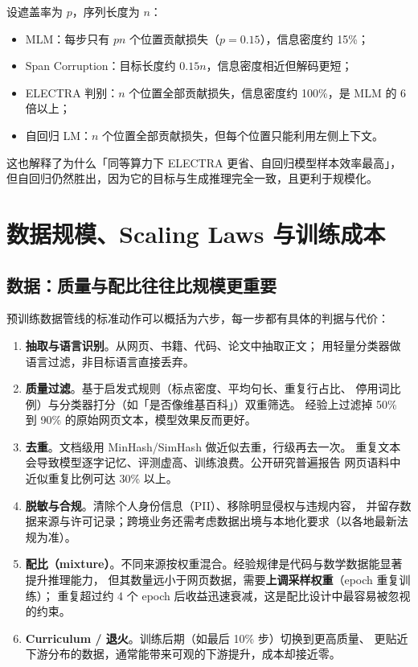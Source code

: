 \begin{formulacard}[各预训练目标的信息密度对比]
设遮盖率为 $p$，序列长度为 $n$：
\begin{itemize}
  \item MLM：每步只有 $pn$ 个位置贡献损失（$p = 0.15$），信息密度约 15\%；
  \item Span Corruption：目标长度约 $0.15n$，信息密度相近但解码更短；
  \item ELECTRA 判别：$n$ 个位置全部贡献损失，信息密度约 100\%，是 MLM 的 6 倍以上；
  \item 自回归 LM：$n$ 个位置全部贡献损失，但每个位置只能利用左侧上下文。
\end{itemize}
这也解释了为什么「同等算力下 ELECTRA 更省、自回归模型样本效率最高」，
但自回归仍然胜出，因为它的目标与生成推理完全一致，且更利于规模化。
\end{formulacard}

\section{数据规模、Scaling Laws 与训练成本}
\label{sec:nlp-scaling}

\subsection{数据：质量与配比往往比规模更重要}

预训练数据管线的标准动作可以概括为六步，每一步都有具体的判据与代价：

\begin{enumerate}
  \item \textbf{抽取与语言识别}。从网页、书籍、代码、论文中抽取正文；
        用轻量分类器做语言过滤，非目标语言直接丢弃。
  \item \textbf{质量过滤}。基于启发式规则（标点密度、平均句长、重复行占比、
        停用词比例）与分类器打分（如「是否像维基百科」）双重筛选。
        经验上过滤掉 50\% 到 90\% 的原始网页文本，模型效果反而更好。
  \item \textbf{去重}。文档级用 MinHash/SimHash 做近似去重，行级再去一次。
        重复文本会导致模型逐字记忆、评测虚高、训练浪费。公开研究普遍报告
        网页语料中近似重复比例可达 30\% 以上。
  \item \textbf{脱敏与合规}。清除个人身份信息（PII）、移除明显侵权与违规内容，
        并留存数据来源与许可记录；跨境业务还需考虑数据出境与本地化要求（以各地最新法规为准）。
  \item \textbf{配比（mixture）}。不同来源按权重混合。经验规律是代码与数学数据能显著提升推理能力，
        但其数量远小于网页数据，需要\textbf{上调采样权重}（epoch 重复训练）；
        重复超过约 4 个 epoch 后收益迅速衰减，这是配比设计中最容易被忽视的约束。
  \item \textbf{Curriculum / 退火}。训练后期（如最后 10\% 步）切换到更高质量、
        更贴近下游分布的数据，通常能带来可观的下游提升，成本却接近零。
\end{enumerate}

